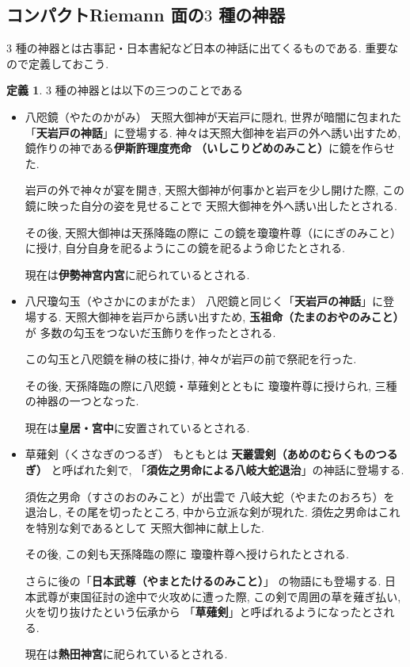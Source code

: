 \documentclass[dvipdfmx,a4paper,11pt]{article} %
\theoremstyle{definition}
\numberwithin{equation}{section}
\newtheorem{defn}[thm]{定義}
\begin{document}
\subsection{コンパクトRiemann 面の$3$ 種の神器}
$3$ 種の神器とは古事記・日本書紀など日本の神話に出てくるものである. 重要なので定義しておこう. 
\begin{defn}
$3$ 種の神器とは以下の三つのことである
\begin{itemize}
    \item

    
    八咫鏡（やたのかがみ）
天照大御神が天岩戸に隠れ, 世界が暗闇に包まれた
    「\textbf{天岩戸の神話}」に登場する.
    神々は天照大御神を岩戸の外へ誘い出すため, 
    鏡作りの神である\textbf{伊斯許理度売命
    （いしこりどめのみこと）}に鏡を作らせた.
    
    岩戸の外で神々が宴を開き, 
    天照大御神が何事かと岩戸を少し開けた際, 
    この鏡に映った自分の姿を見せることで
    天照大御神を外へ誘い出したとされる.
    
    その後, 天照大御神は天孫降臨の際に
    この鏡を瓊瓊杵尊（ににぎのみこと）に授け, 
    自分自身を祀るようにこの鏡を祀るよう命じたとされる.
    
    現在は\textbf{伊勢神宮内宮}に祀られているとされる.

    \item

    
    八尺瓊勾玉（やさかにのまがたま）
八咫鏡と同じく「\textbf{天岩戸の神話}」に登場する.
    天照大御神を岩戸から誘い出すため, 
    \textbf{玉祖命（たまのおやのみこと）}が
    多数の勾玉をつないだ玉飾りを作ったとされる.
    
    この勾玉と八咫鏡を榊の枝に掛け, 
    神々が岩戸の前で祭祀を行った.
    
    その後, 天孫降臨の際に八咫鏡・草薙剣とともに
    瓊瓊杵尊に授けられ, 
    三種の神器の一つとなった.
    
    現在は\textbf{皇居・宮中}に安置されているとされる.

    \item

    
    草薙剣（くさなぎのつるぎ）
もともとは
    \textbf{天叢雲剣（あめのむらくものつるぎ）}
    と呼ばれた剣で, 
    「\textbf{須佐之男命による八岐大蛇退治}」の神話に登場する.
    
    須佐之男命（すさのおのみこと）が出雲で
    八岐大蛇（やまたのおろち）を退治し, 
    その尾を切ったところ, 中から立派な剣が現れた.
    須佐之男命はこれを特別な剣であるとして
    天照大御神に献上した.
    
    その後, この剣も天孫降臨の際に
    瓊瓊杵尊へ授けられたとされる.
    
    さらに後の「\textbf{日本武尊（やまとたけるのみこと）}」
    の物語にも登場する.
    日本武尊が東国征討の途中で火攻めに遭った際, 
    この剣で周囲の草を薙ぎ払い, 
    火を切り抜けたという伝承から
    「\textbf{草薙剣}」と呼ばれるようになったとされる.
    
    現在は\textbf{熱田神宮}に祀られているとされる.
\end{itemize}
\end{defn}
\end{document}
